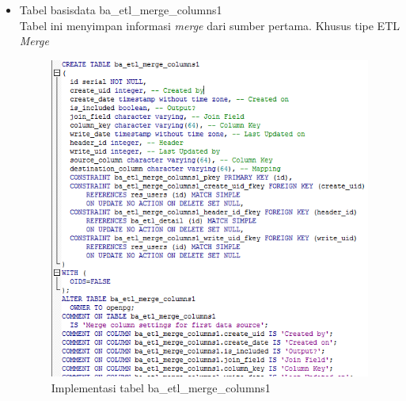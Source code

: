 \begin{itemize}
		\item Tabel basisdata ba\_etl\_merge\_columns1\\
		Tabel ini menyimpan informasi \textit{merge} dari sumber pertama. Khusus tipe ETL \textit{Merge}
		\begin{figure}[H]
		\centering
		\includegraphics[scale=0.5]{Gambar/tabel-ba-etl-merge-columns1}
		\caption{Implementasi tabel ba\_etl\_merge\_columns1}
		\end{figure}
		

\end{itemize}
